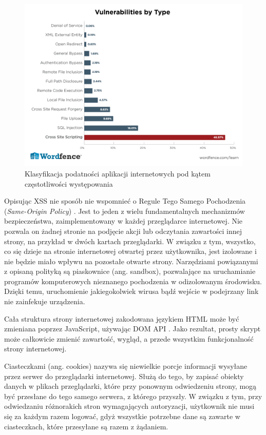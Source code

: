 \documentclass[12pt,twoside]{article}
\begin{document}
\begin{figure}[H]
	\centering
	\includegraphics[width=0.9\linewidth]{figures/xss-popularity}
	\caption{Klasyfikacja podatności aplikacji internetowych pod kątem częstotliwości występowania \cite{XSSReport}}
	\label{fig:xss-popularity}
\end{figure}



Opisując XSS nie sposób nie wspomnieć o Regule Tego Samego Pochodzenia (\emph{Same-Origin Policy}) \cite{SameOriginPolicy}. Jest to jeden z wielu fundamentalnych mechanizmów bezpieczeństwa, zaimplementowany w każdej przeglądarce internetowej. Nie pozwala on żadnej stronie na podjęcie akcji lub odczytania zawartości innej strony, na przykład w dwóch kartach przeglądarki. W związku z tym, wszystko, co się dzieje na stronie internetowej otwartej przez użytkownika, jest izolowane i nie będzie miało wpływu na pozostałe otwarte strony. Narzędziami powiązanymi z opisaną polityką są piaskownice (ang. sandbox), pozwalające na uruchamianie programów komputerowych nieznanego pochodzenia w odizolowanym środowisku. Dzięki temu, uruchomienie jakiegokolwiek wirusa bądź wejście w podejrzany link nie zainfekuje urządzenia.
	
	Cała struktura strony internetowej zakodowana językiem HTML może być zmieniana poprzez JavaScript, używając DOM API \cite{DOM}. Jako rezultat, prosty skrypt może całkowicie zmienić zawartość, wygląd, a przede wszystkim funkcjonalność strony internetowej.
	
	Ciasteczkami (ang. cookies) \cite{Cookies} nazywa się niewielkie porcje informacji wysyłane przez serwer do przeglądarki internetowej. Służą do tego, by zapisać obiekty danych w plikach przeglądarki, które przy ponownym odwiedzeniu strony, mogą być przesłane do tego samego serwera, z którego przyszły. W związku z tym, przy odwiedzaniu różnorakich stron wymagających autoryzacji, użytkownik nie musi się za każdym razem logować, gdyż wszystkie potrzebne dane są zawarte w ciasteczkach, które przesyłane są razem z żądaniem. 
	
\end{document}
